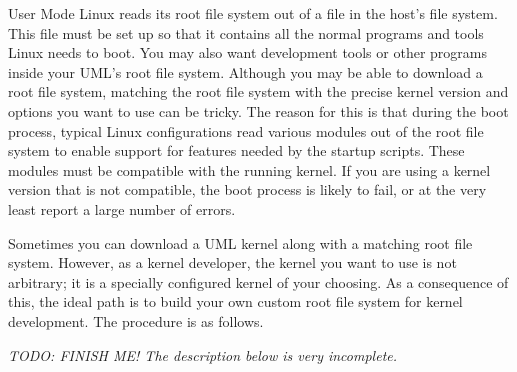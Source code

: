 \documentclass{article}
\newcommand{\todo}[1]{\textit{TODO: #1}}
\begin{document}
User Mode Linux reads its root file system out of a file in the host's file system. This file
must be set up so that it contains all the normal programs and tools Linux needs to boot. You
may also want development tools or other programs inside your UML's root file system. Although
you may be able to download a root file system, matching the root file system with the precise
kernel version and options you want to use can be tricky. The reason for this is that during the
boot process, typical Linux configurations read various modules out of the root file system to
enable support for features needed by the startup scripts. These modules must be compatible with
the running kernel. If you are using a kernel version that is not compatible, the boot process
is likely to fail, or at the very least report a large number of errors.

Sometimes you can download a UML kernel along with a matching root file system. However, as a
kernel developer, the kernel you want to use is not arbitrary; it is a specially configured
kernel of your choosing. As a consequence of this, the ideal path is to build your own custom
root file system for kernel development. The procedure is as follows.

\todo{FINISH ME! The description below is very incomplete.}
\end{document}
